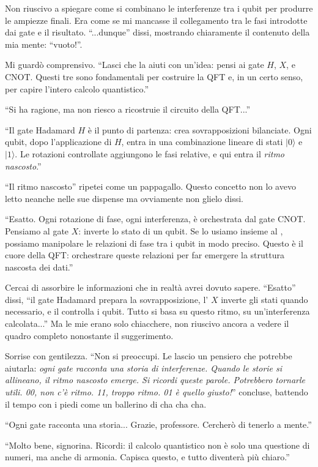 \begin{dialogue}
 Non riuscivo a spiegare come si combinano le interferenze tra i qubit per produrre le ampiezze finali. Era come se mi mancasse il collegamento tra le fasi introdotte dai gate  e il risultato. \enquote{...dunque} dissi, mostrando chiaramente il contenuto della mia mente: ``vuoto!''.

 Mi guardò comprensivo. \enquote{Lasci che la aiuti con un'idea: pensi ai gate \( H \), \( X \), e \( \text{CNOT} \). Questi tre sono fondamentali per costruire la QFT e, in un certo senso, per capire l'intero calcolo quantistico.}

 \enquote{Si ha ragione, ma non riesco a ricostruie il circuito della QFT...}

 \enquote{Il gate Hadamard \( H \) è il punto di partenza: crea sovrapposizioni bilanciate. Ogni qubit, dopo l'applicazione di \( H \), entra in una combinazione lineare di stati \(|0\rangle\) e \(|1\rangle\). Le rotazioni controllate aggiungono le fasi relative, e qui entra il \textit{ritmo nascosto}.}

 \enquote{Il ritmo nascosto} ripetei come un pappagallo. Questo concetto  non lo avevo letto neanche nelle sue dispense ma ovviamente non glielo dissi.

 \enquote{Esatto. Ogni rotazione di fase, ogni interferenza, è orchestrata dal gate \( \text{CNOT} \). Pensiamo al gate \( X \): inverte lo stato di un qubit. Se lo usiamo insieme al , possiamo manipolare le relazioni di fase tra i qubit in modo preciso. Questo è il cuore della QFT: orchestrare queste relazioni per far emergere la struttura nascosta dei dati.}

 Cercai di assorbire le informazioni che in realtà avrei dovuto sapere. \enquote{Esatto} dissi, \enquote{il gate Hadamard prepara la sovrapposizione, l' \( X \) inverte gli stati quando necessario, e il  controlla  i qubit. Tutto si basa su questo ritmo, su un'interferenza calcolata...} Ma le mie erano solo chiacchere, non riuscivo ancora a vedere il quadro completo nonostante il suggerimento.

 Sorrise con gentilezza. \enquote{Non si preoccupi. Le lascio un pensiero che potrebbe aiutarla: \textit{ogni gate racconta una storia di interferenze. Quando le storie si allineano, il ritmo nascosto emerge. Si ricordi queste parole. Potrebbero tornarle utili. 00, non c'è ritmo. 11, troppo ritmo. 01 è quello giusto!}} concluse, battendo il tempo con i piedi come un ballerino di cha cha cha.

 \enquote{Ogni gate racconta una storia... Grazie, professore. Cercherò di tenerlo a mente.}

 \enquote{Molto bene, signorina. Ricordi: il calcolo quantistico non è solo una questione di numeri, ma anche di armonia. Capisca questo, e tutto diventerà più chiaro.}

\end{dialogue}

